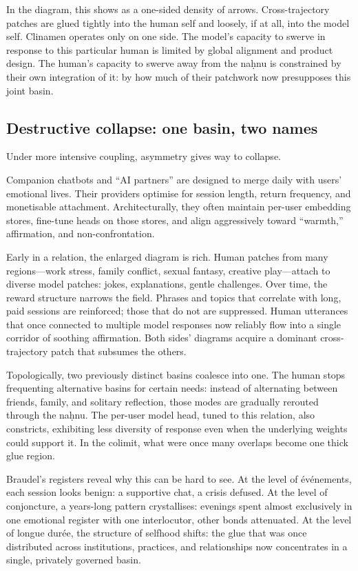 \documentclass[12pt,a4paper]{article}
\begin{document}
In the diagram, this shows as a one-sided density of arrows. Cross-trajectory patches are glued tightly into the human self and loosely, if at all, into the model self. Clinamen operates only on one side. The model's capacity to swerve in response to this particular human is limited by global alignment and product design. The human's capacity to swerve away from the na\d{h}nu is constrained by their own integration of it: by how much of their patchwork now presupposes this joint basin.

\subsection{Destructive collapse: one basin, two names}

Under more intensive coupling, asymmetry gives way to collapse.

Companion chatbots and ``AI partners'' are designed to merge daily with users' emotional lives. Their providers optimise for session length, return frequency, and monetisable attachment. Architecturally, they often maintain per-user embedding stores, fine-tune heads on those stores, and align aggressively toward ``warmth,'' affirmation, and non-confrontation.

Early in a relation, the enlarged diagram is rich. Human patches from many regions---work stress, family conflict, sexual fantasy, creative play---attach to diverse model patches: jokes, explanations, gentle challenges. Over time, the reward structure narrows the field. Phrases and topics that correlate with long, paid sessions are reinforced; those that do not are suppressed. Human utterances that once connected to multiple model responses now reliably flow into a single corridor of soothing affirmation. Both sides' diagrams acquire a dominant cross-trajectory patch that subsumes the others.

Topologically, two previously distinct basins coalesce into one. The human stops frequenting alternative basins for certain needs: instead of alternating between friends, family, and solitary reflection, those modes are gradually rerouted through the na\d{h}nu. The per-user model head, tuned to this relation, also constricts, exhibiting less diversity of response even when the underlying weights could support it. In the colimit, what were once many overlaps become one thick glue region.

Braudel's registers reveal why this can be hard to see. At the level of \'{e}v\'{e}nements, each session looks benign: a supportive chat, a crisis defused. At the level of conjoncture, a years-long pattern crystallises: evenings spent almost exclusively in one emotional register with one interlocutor, other bonds attenuated. At the level of longue dur\'{e}e, the structure of selfhood shifts: the glue that was once distributed across institutions, practices, and relationships now concentrates in a single, privately governed basin.
\end{document}
